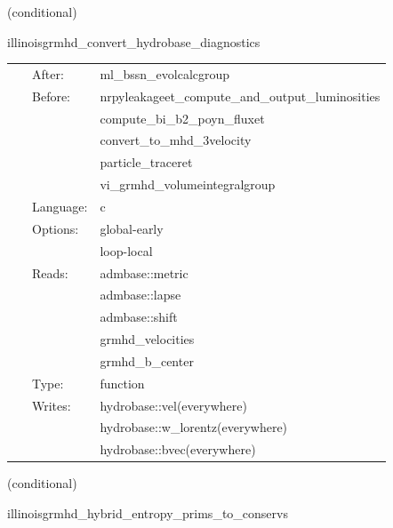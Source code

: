 \vspace{5mm}

   (conditional) 

\hspace{5mm} illinoisgrmhd\_convert\_hydrobase\_diagnostics 

\hspace{5mm}{\it convert illinoisgrmhd-native variables to hydrobase } 


\hspace{5mm}

 \begin{tabular*}{160mm}{cll} 
~ & After:  & ml\_bssn\_evolcalcgroup \\ 
~ & Before:  & nrpyleakageet\_compute\_and\_output\_luminosities \\ 
~& ~ &compute\_bi\_b2\_poyn\_fluxet\\ 
~& ~ &convert\_to\_mhd\_3velocity\\ 
~& ~ &particle\_traceret\\ 
~& ~ &vi\_grmhd\_volumeintegralgroup\\ 
~ & Language:  & c \\ 
~ & Options:  & global-early \\ 
~& ~ &loop-local\\ 
~ & Reads:  & admbase::metric \\ 
~& ~ &admbase::lapse\\ 
~& ~ &admbase::shift\\ 
~& ~ &grmhd\_velocities\\ 
~& ~ &grmhd\_b\_center\\ 
~ & Type:  & function \\ 
~ & Writes:  & hydrobase::vel(everywhere) \\ 
~& ~ &hydrobase::w\_lorentz(everywhere)\\ 
~& ~ &hydrobase::bvec(everywhere)\\ 
\end{tabular*} 


\vspace{5mm}

   (conditional) 

\hspace{5mm} illinoisgrmhd\_hybrid\_entropy\_prims\_to\_conservs 

\hspace{5mm}{\it entropy+hybrid version of illinoisgrmhd\_prims\_to\_conservs } 


\hspace{5mm}

